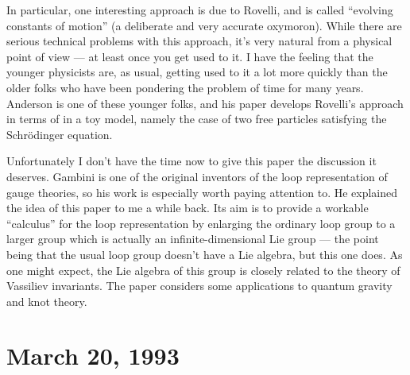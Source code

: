 \documentclass{article}
\def\tightlist{}
\renewcommand{\texttt}[1]{%
  \begingroup
  \ttfamily
  \begingroup\lccode`~=`/\lowercase{\endgroup\def~}{/\discretionary{}{}{}}%
  \begingroup\lccode`~=`[\lowercase{\endgroup\def~}{[\discretionary{}{}{}}%
  \begingroup\lccode`~=`.\lowercase{\endgroup\def~}{.\discretionary{}{}{}}%
  \catcode`/=\active\catcode`[=\active\catcode`.=\active
  \scantokens{#1\noexpand}%
  \endgroup
}
\begin{document}

In particular, one interesting approach is due to Rovelli, and is called
``evolving constants of motion'' (a deliberate and very accurate
oxymoron). While there are serious technical problems with this
approach, it's very natural from a physical point of view --- at least
once you get used to it. I have the feeling that the younger physicists
are, as usual, getting used to it a lot more quickly than the older
folks who have been pondering the problem of time for many years.
Anderson is one of these younger folks, and his paper develops Rovelli's
approach in terms of in a toy model, namely the case of two free
particles satisfying the Schr\"odinger equation.


Unfortunately I don't have the time now to give this paper the
discussion it deserves. Gambini is one of the original inventors of the
loop representation of gauge theories, so his work is especially worth
paying attention to. He explained the idea of this paper to me a while
back. Its aim is to provide a workable ``calculus'' for the loop
representation by enlarging the ordinary loop group to a larger group
which is actually an infinite-dimensional Lie group --- the point being
that the usual loop group doesn't have a Lie algebra, but this one does.
As one might expect, the Lie algebra of this group is closely related to
the theory of Vassiliev invariants. The paper considers some
applications to quantum gravity and knot theory.



\hypertarget{week10}{%
\section{March 20, 1993}\label{week10}}
\end{document}
